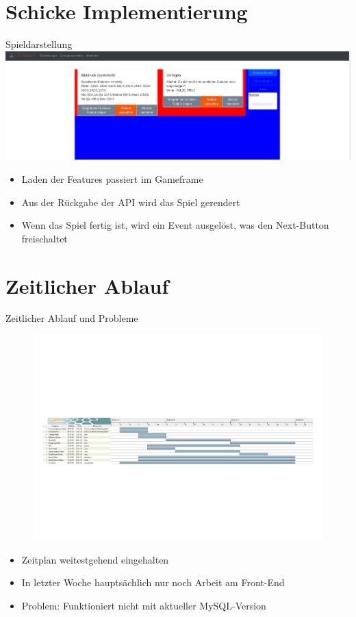 \documentclass[xcolor=dvipsnames]{beamer}
\begin{document}
\section{Schicke Implementierung}
\begin{frame}{Spieldarstellung}
\includegraphics[width=\textwidth]{../img/gameframe.png}
\begin{itemize}
    \item Laden der Features passiert im Gameframe
    \item Aus der Rückgabe der API wird das Spiel gerendert
    \item Wenn das Spiel fertig ist, wird ein Event ausgelöst, was den Next-Button freischaltet
\end{itemize}
\end{frame}

\section{Zeitlicher Ablauf}
\begin{frame}{Zeitlicher Ablauf und Probleme}
\begin{figure}
\centering
\includegraphics[width=\textwidth]{../img/gantt.pdf}
\end{figure}
\begin{itemize}
	\item Zeitplan weitestgehend eingehalten
	\item In letzter Woche hauptsächlich nur noch Arbeit am Front-End
	\item Problem: Funktioniert nicht mit aktueller MySQL-Version
\end{itemize}
\end{frame}
\end{document}

